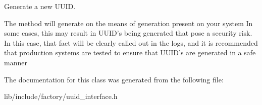 Generate a new U\-U\-I\-D. 

The method will generate on the means of generation present on your system In some cases, this may result in U\-U\-I\-D's being generated that pose a security risk. In this case, that fact will be clearly called out in the logs, and it is recommended that production systems are tested to ensure that U\-U\-I\-D's are generated in a safe manner 

The documentation for this class was generated from the following file\-:\begin{DoxyCompactItemize}
\item 
lib/include/factory/uuid\-\_\-interface.\-h\end{DoxyCompactItemize}
